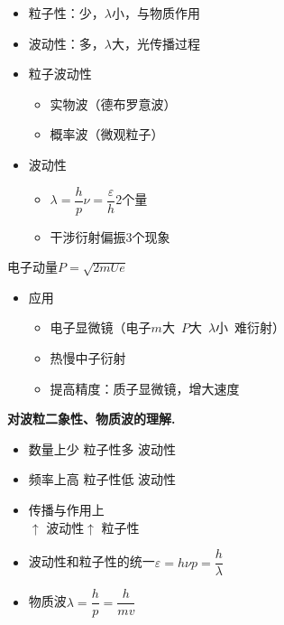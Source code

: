 \begin{itemize}
\item 粒子性：少，$\lambda$小，与物质作用
\item 波动性：多，$\lambda$大，光传播过程
\end{itemize}

\begin{itemize}
\item 粒子波动性
  \begin{itemize}
  \item 实物波（德布罗意波）
  \item 概率波（微观粒子）
  \end{itemize}
\item 波动性
  \begin{itemize}
  \item $\lambda=\dfrac{h}{p}$\quad $\nu=\dfrac{\varepsilon}{h}$\qquad 2个量
  \item 干涉\quad 衍射\quad 偏振\qquad 3个现象
  \end{itemize}
\end{itemize}

电子动量\quad $P=\sqrt{2mUe}$ %

\begin{itemize}
\item 应用
  \begin{itemize}
  \item 电子显微镜（电子$m$大\ $P$大\ $\lambda$小\ 难衍射） %
  \item 热慢中子衍射 %
  \item 提高精度：质子显微镜，增大速度
  \end{itemize}
\end{itemize}

\textbf{对波粒二象性、物质波的理解.}
\begin{itemize}
\item 数量上\quad 少 粒子性\quad 多 波动性
\item 频率上\quad 高 粒子性\quad 低 波动性
\item 传播与作用上\\
  $\uparrow$ 波动性\quad $\uparrow$ 粒子性 %
\item 波动性和粒子性的统一\quad $\varepsilon=h\nu$\quad $p=\dfrac{h}{\lambda}$
\item 物质波\quad $\lambda=\dfrac{h}{p}=\dfrac{h}{mv}$
\end{itemize}

